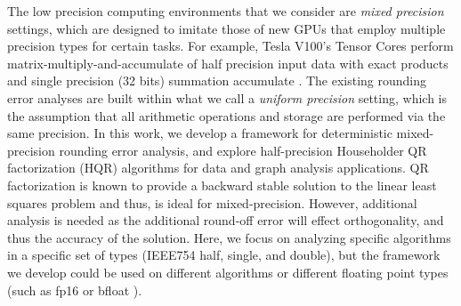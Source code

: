 The low precision computing environments that we consider are \emph{mixed precision} settings, which are designed to imitate those of new GPUs that employ multiple precision types for certain tasks. 
For example, Tesla V100's Tensor Cores perform matrix-multiply-and-accumulate of half precision input data with exact products and single precision (32 bits) summation accumulate \cite{nvdia}.
The existing rounding error analyses are built within what we call a \emph{uniform precision} setting, which is the assumption that all arithmetic operations and storage are performed via the same precision.
In this work, we develop a framework for deterministic mixed-precision rounding error analysis, and explore half-precision Householder QR factorization (HQR) algorithms for data and graph analysis applications. 
QR factorization is known to provide a backward stable solution to the linear least squares problem and thus, is ideal for mixed-precision. 
However, additional analysis is needed as the additional round-off error will effect orthogonality, and thus the accuracy of the solution. 
Here, we focus on analyzing specific algorithms in a specific set of types (IEEE754 half, single, and double), but the framework we develop 
could be used on different algorithms or different floating point types (such as fp16 or bfloat \cite{tagliavini2018floating}).\par

